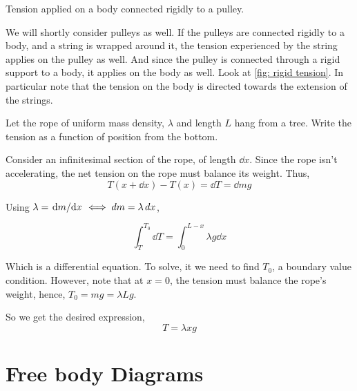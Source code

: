 \begin{marginfigure}
    \caption{Tension applied on a body connected rigidly to a pulley.}
    \label{fig: rigid tension}
\end{marginfigure}

We will shortly consider pulleys as well. If the pulleys are connected rigidly to 
a body, and a string is wrapped around it, the tension experienced by the string applies on the 
pulley as well. And since the pulley is connected through a rigid support to a body, 
it applies on the body as well. Look at \cref{fig: rigid tension}. In particular note that 
the tension on the body is directed towards the extension of the strings.

\begin{example}
    Let the rope of uniform mass density, \(\lambda\) and length \(L\) hang from a tree. Write the tension as 
    a function of position from the bottom. 
    \begin{soln}
        Consider an infinitesimal section of the rope, of length \(\dd{x}\). Since 
        the rope isn't accelerating, the net tension on the rope must balance its weight.
        Thus,
        \begin{equation*}
            T(x + \dd{x}) - T(x) = \dd{T} = \dd{m} g
        \end{equation*}

        Using \(\lambda = \dv*{m}{x} \iff \mathop{}\!{d}{m} = \lambda \mathop{}\!{d}{x}\),

        \begin{equation*}
            \int_{T}^{T_0} \dd{T} = \int_0^{L-x} \lambda g \dd{x}
        \end{equation*}

        Which is a differential equation. To solve, it we need to find \(T_0\), 
        a boundary value condition. However, note that at \(x = 0\), 
        the tension must balance the rope's weight, hence, \(T_0 = mg = \lambda Lg\).

        So we get the desired expression, \begin{equation*}
            T = \lambda xg
        \end{equation*}
    \end{soln}
\end{example}

\section{Free body Diagrams}

